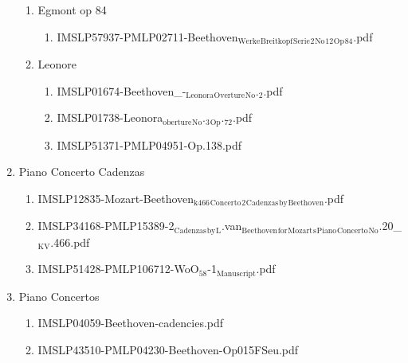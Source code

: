 \documentclass[11pt]{article}
\begin{document}
\begin{enumerate}
\begin{enumerate}
\item Egmont op 84
\label{sec-1-1-1-1-44-9-3-8}
\begin{enumerate}
\item IMSLP57937-PMLP02711-Beethoven$_{\text{Werke}}$$_{\text{Breitkopf}}$$_{\text{Serie}}$$_{\text{2}}$$_{\text{No}}$$_{\text{12}}$$_{\text{Op}}$$_{\text{84}}$.pdf
\label{sec-1-1-1-1-44-9-3-8-1}
\end{enumerate}

\item Leonore
\label{sec-1-1-1-1-44-9-3-9}
\begin{enumerate}
\item IMSLP01674-Beethoven\_-$_{\text{Leonora}}$$_{\text{Overture}}$$_{\text{No}}$.$_{\text{2}}$.pdf
\label{sec-1-1-1-1-44-9-3-9-1}

\item IMSLP01738-Leonora$_{\text{oberture}}$$_{\text{No}}$.$_{\text{3}}$$_{\text{Op}}$.$_{\text{72}}$.pdf
\label{sec-1-1-1-1-44-9-3-9-2}

\item IMSLP51371-PMLP04951-Op.138.pdf
\label{sec-1-1-1-1-44-9-3-9-3}
\end{enumerate}
\end{enumerate}

\item Piano Concerto Cadenzas
\label{sec-1-1-1-1-44-9-4}
\begin{enumerate}
\item IMSLP12835-Mozart-Beethoven$_{\text{k466}}$$_{\text{Concerto}}$$_{\text{2}}$$_{\text{Cadenzas}}$$_{\text{by}}$$_{\text{Beethoven}}$.pdf
\label{sec-1-1-1-1-44-9-4-1}

\item IMSLP34168-PMLP15389-2$_{\text{Cadenzas}}$$_{\text{by}}$$_{\text{L}}$.van$_{\text{Beethoven}}$$_{\text{for}}$$_{\text{Mozart}}$$_{\text{s}}$$_{\text{Piano}}$$_{\text{Concerto}}$$_{\text{No}}$.20\_$_{\text{KV}}$.466.pdf
\label{sec-1-1-1-1-44-9-4-2}

\item IMSLP51428-PMLP106712-WoO$_{\text{58}}$-1$_{\text{Manuscript}}$.pdf
\label{sec-1-1-1-1-44-9-4-3}
\end{enumerate}

\item Piano Concertos
\label{sec-1-1-1-1-44-9-5}
\begin{enumerate}
\item IMSLP04059-Beethoven-cadencies.pdf
\label{sec-1-1-1-1-44-9-5-1}

\item IMSLP43510-PMLP04230-Beethoven-Op015FSeu.pdf
\label{sec-1-1-1-1-44-9-5-2}


\end{enumerate}
\end{enumerate}
\end{document}
